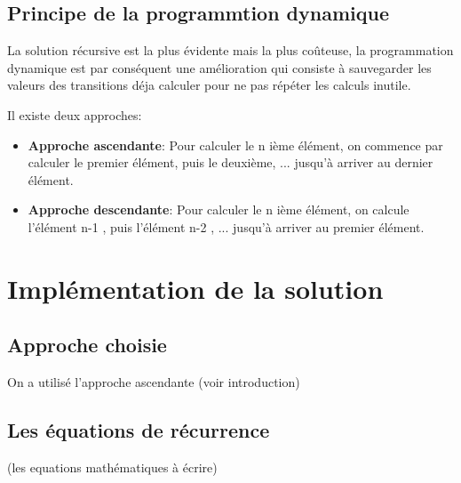 \documentclass[12pt]{report}
\begin{document}
	\section{Principe de la programmtion dynamique}
	La solution récursive est la plus évidente mais la plus coûteuse, la programmation dynamique est par conséquent une amélioration qui consiste à sauvegarder les valeurs des transitions déja calculer pour ne pas répéter les calculs inutile.
	\par{}
	Il existe deux approches:
	\begin{itemize}
		\item \textbf {Approche ascendante}:
		Pour calculer le n ième élément, on commence par calculer le premier élément, puis le deuxième, ... jusqu'à arriver au dernier élément.
		\item \textbf {Approche descendante}:
		Pour calculer le n ième élément, on calcule l'élément n-1 , puis l'élément n-2 , ... jusqu'à arriver au premier élément.
		
	\end{itemize}	
	\chapter{Implémentation de la solution}
	\section{Approche choisie}
	On a utilisé l'approche ascendante (voir introduction)
	\section{Les équations de récurrence}
	(les equations mathématiques à écrire)
\end{document}
